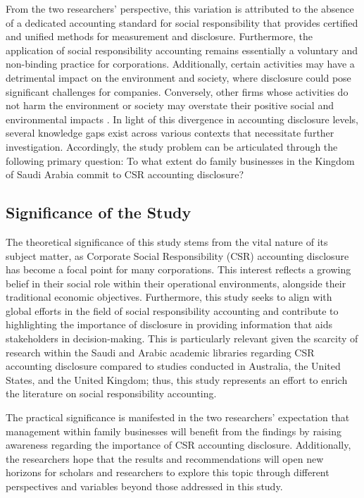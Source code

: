 \documentclass{NSP1}
\begin{document}
From the two researchers' perspective, this variation is attributed to the absence of a dedicated accounting standard for social responsibility that provides certified and unified methods for measurement and disclosure. Furthermore, the application of social responsibility accounting remains essentially a voluntary and non-binding practice for corporations. Additionally, certain activities may have a detrimental impact on the environment and society, where disclosure could pose significant challenges for companies. Conversely, other firms whose activities do not harm the environment or society may overstate their positive social and environmental impacts \cite{ref35}. In light of this divergence in accounting disclosure levels, several knowledge gaps exist across various contexts that necessitate further investigation. Accordingly, the study problem can be articulated through the following primary question: To what extent do family businesses in the Kingdom of Saudi Arabia commit to CSR accounting disclosure?

\subsection{Significance of the Study}
The theoretical significance of this study stems from the vital nature of its subject matter, as Corporate Social Responsibility (CSR) accounting disclosure has become a focal point for many corporations. This interest reflects a growing belief in their social role within their operational environments, alongside their traditional economic objectives. Furthermore, this study seeks to align with global efforts in the field of social responsibility accounting and contribute to highlighting the importance of disclosure in providing information that aids stakeholders in decision-making. This is particularly relevant given the scarcity of research within the Saudi and Arabic academic libraries regarding CSR accounting disclosure compared to studies conducted in Australia, the United States, and the United Kingdom; thus, this study represents an effort to enrich the literature on social responsibility accounting.

The practical significance is manifested in the two researchers' expectation that management within family businesses will benefit from the findings by raising awareness regarding the importance of CSR accounting disclosure. Additionally, the researchers hope that the results and recommendations will open new horizons for scholars and researchers to explore this topic through different perspectives and variables beyond those addressed in this study.
\end{document}
